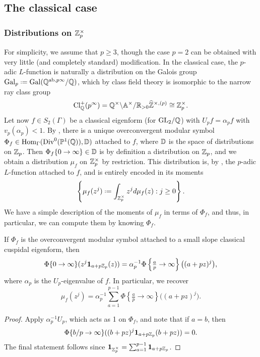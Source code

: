 \documentclass[a4paper,11pt]{article}
\numberwithin{equation}{section}
\begin{document}
\subsection{The classical case}
\subsubsection{Distributions on $\mathbb{Z}_p^\times$}

For simplicity, we assume that $p \geq 3$, though the case $p = 2$ can be obtained with very little (and completely standard) modification. In the classical case, the $p$-adic $L$-function is naturally a distribution on the Galois group $\mathrm{Gal}_p \defeq \mathrm{Gal}(\Q^{\mathrm{ab},p\infty}/\Q)$, which by class field theory is isomorphic to the narrow ray class group
\[
	\mathrm{Cl}_{\mathbb{Q}}^+(p^\infty) = \mathbb{Q}^\times\backslash \mathbb{A}^\times/\mathbb{R}_{>0}\widehat{\mathbb{Z}}^{\times,(p)} \cong \mathbb{Z}_p^\times.
\]
Let now $f \in S_2(\Gamma)$ be a classical eigenform (for $\mathrm{GL}_2/\mathbb{Q}$) with $U_pf = \alpha_p f$ with $v_p(\alpha_p) < 1$. By \cite{PS11}, there is a unique overconvergent modular symbol $\Phi_f \in \mathrm{Hom}_\Gamma(\mathrm{Div}^0(\mathbb{P}^1(\mathbb{Q})),\mathbb{D})$ attached to $f$, where $\mathbb{D}$ is the space of distributions on $\mathbb{Z}_p$. Then $\Phi_f\{0 \to \infty\} \in \mathbb{D}$ is by definition a distribution on $\mathbb{Z}_p$, and we obtain a distribution $\mu_f$ on $\mathbb{Z}_p^\times$ by restriction. This distribution is, by \cite{PS11}, the $p$-adic $L$-function attached to $f$, and is entirely encoded in its moments
\[
\left\{\mu_f(z^j) \defeq \int_{\Zp^\times} z^j d\mu_f(z) : j \geq 0\right\}.
\] We have a simple description of the moments of $\mu_f$ in terms of $\Phi_f$, and thus, in particular, we can compute them by knowing $\Phi_f$.

\begin{proposition}\label{prop:apply Up}
	If $\Phi_f$ is the overconvergent modular symbol attached to a small slope classical cuspidal eigenform, then
	\[
		\Phi\{0\rightarrow\infty\}(z^j \mathbf{1}_{a+p\mathbb{Z}_p}(z)) = \alpha_p^{-1}\Phi\left\{\tfrac{a}{p} \rightarrow \infty\right\}\big((a+pz)^j\big),
	\]
     where $\alpha_p$ is the $U_p$-eigenvalue of $f$. In particular, we recover
     \[
     	\mu_f(z^j) = \alpha_p^{-1}\sum_{a=1}^{p-1} \Phi\left\{\tfrac{a}{p} \rightarrow \infty\right\}\big((a+pz)^j\big).
     \]
\end{proposition}
\begin{proof}
Apply $\alpha_p^{-1}U_p$, which acts as 1 on $\Phi_f$, and note that if $a = b$, then
\[
\Phi\{b/p \rightarrow \infty\}((b+pz)^j\mathbf{1}_{a+p\mathbb{Z}_p}(b+pz)) = 0. \qedhere
\]
The final statement follows since $\mathbf{1}_{\mathbb{Z}_p^\times} = \sum_{a=1}^{p-1}\mathbf{1}_{a+p\mathbb{Z}_p}$.
\end{proof}
\end{document}
